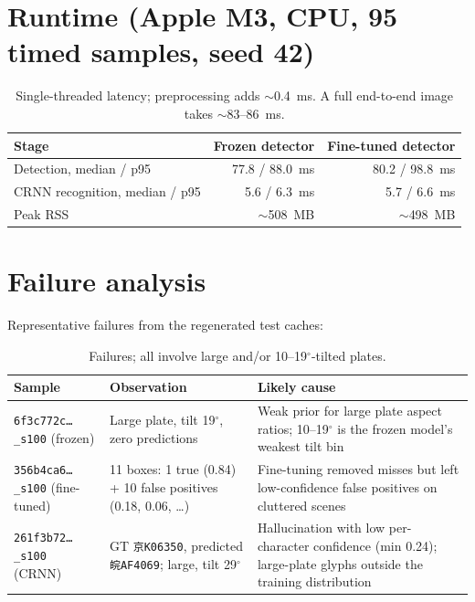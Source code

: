 \documentclass[11pt]{article}
\begin{document}
\section{Runtime (Apple M3, CPU, 95 timed samples, seed 42)}

\begin{table}[H]
\centering
\small
\begin{tabular}{@{}lrr@{}}
\toprule
Stage & Frozen detector & Fine-tuned detector \\
\midrule
Detection, median / p95 & 77.8 / 88.0~ms & 80.2 / 98.8~ms \\
CRNN recognition, median / p95 & 5.6 / 6.3~ms & 5.7 / 6.6~ms \\
Peak RSS & $\sim$508~MB & $\sim$498~MB \\
\bottomrule
\end{tabular}
\caption{Single-threaded latency; preprocessing adds $\sim$0.4~ms. A full
end-to-end image takes $\sim$83--86~ms.}
\end{table}

\section{Failure analysis}

Representative failures from the regenerated test caches:

\begin{table}[H]
\centering
\small
\setlength{\tabcolsep}{4pt}
\begin{tabular}{@{}p{4.2cm}p{4.9cm}p{5.3cm}@{}}
\toprule
Sample & Observation & Likely cause \\
\midrule
\texttt{6f3c772c\ldots\_s100} (frozen) & Large plate, tilt 19$^{\circ}$,
zero predictions & Weak prior for large plate aspect ratios; 10--19$^{\circ}$
is the frozen model's weakest tilt bin \\
\texttt{356b4ca6\ldots\_s100} (fine-tuned) & 11 boxes: 1 true (0.84) + 10
false positives (0.18, 0.06, \ldots) & Fine-tuning removed misses but left
low-confidence false positives on cluttered scenes \\
\texttt{261f3b72\ldots\_s100} (CRNN) & GT \texttt{京K06350}, predicted
\texttt{皖AF4069}; large, tilt 29$^{\circ}$ & Hallucination with low
per-character confidence (min 0.24); large-plate glyphs outside the
training distribution \\
\bottomrule
\end{tabular}
\caption{Failures; all involve large and/or 10--19$^{\circ}$-tilted
plates.}
\end{table}
\end{document}
